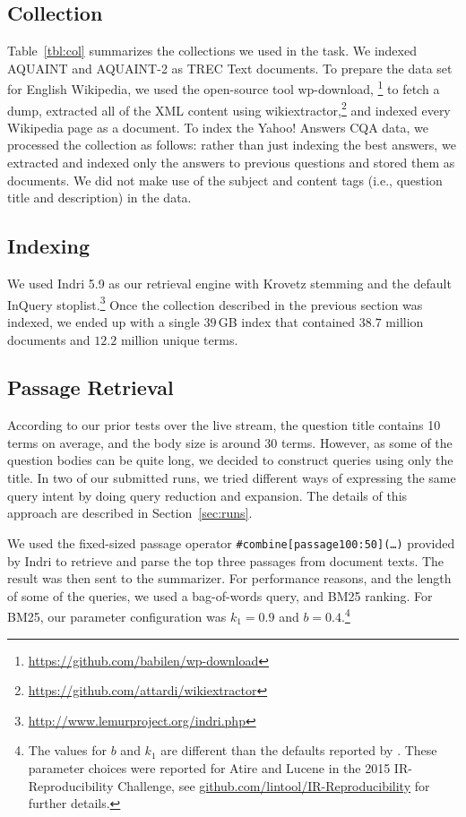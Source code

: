 \documentclass[a4paper,10pt,conference,compsocconf,final]{IEEEtran}
\newcommand\method[1]{{\sf\small{#1}}}
\newcommand\gb[1]{$#1$\,GB}
\begin{document}
{{{{\subsection{Collection}

Table~{\ref{tbl:col}} summarizes the collections we used in the task.  We
indexed AQUAINT and AQUAINT-2 as TREC Text documents.
To prepare the data set for English Wikipedia, we used the
open-source tool {\method{wp-download}},
\footnote{\url{https://github.com/babilen/wp-download}} to fetch a
dump, extracted all of the XML content using
{\method{wikiextractor}},\footnote{\url{https://github.com/attardi/wikiextractor}}
and indexed every Wikipedia page as a document.
To index the Yahoo! Answers CQA data, we processed the collection as 
follows: rather than just indexing the best answers, we extracted and
indexed only the answers to previous questions and stored them as
documents.
We did not make use of the subject and content tags (i.e., question
title and description) in the data.

\subsection{Indexing}
We used Indri 5.9 as our retrieval engine with Krovetz stemming and
the default InQuery
stoplist.\footnote{\url{http://www.lemurproject.org/indri.php}}
Once the collection described in the previous section was indexed, we 
ended up with a single \gb{39} index that contained $38.7$
million documents and $12.2$ million unique terms.

\subsection{Passage Retrieval}
\label{sec:passage}

According to our prior tests over the live stream, the question title
contains 10 terms on average, and the body size is around 30 terms.
However, as some of the question bodies can be quite long, we decided to 
construct queries using only the title.
In two of our submitted runs, we tried different ways of expressing
the same query intent by doing query reduction and expansion.
The details of this approach are described in Section~\ref{sec:runs}.

We used the fixed-sized passage operator
\texttt{\#combine[passage100:50](\ldots)} provided by Indri to
retrieve and parse the top three passages from document texts.
The result was then sent to the summarizer.
For performance reasons, and the length of some of the queries, we
used a bag-of-words query, and BM25 ranking.
For BM25, our parameter configuration was $k_1=0.9$ and $b=0.4$.\footnote{The values for $b$ and $k_1$ are different than the
defaults reported by {\citet{rwj+94-trec}}.
These parameter choices were reported for Atire and Lucene in the
2015 IR-Reproducibility Challenge, see
{\url{github.com/lintool/IR-Reproducibility}} for further details.}

}}}}
\end{document}
